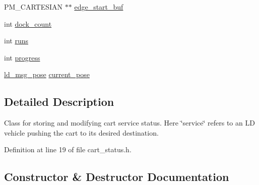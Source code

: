 \begin{DoxyCompactItemize}
\item 
P\+M\+\_\+\+C\+A\+R\+T\+E\+S\+I\+AN $\ast$$\ast$ \mbox{\hyperlink{classcart__status_ab0947b06cd41da791e41a480c42f795e}{edge\+\_\+start\+\_\+buf}}
\item 
int \mbox{\hyperlink{classcart__status_a37e9ce8c21a0d76250866a6fd7550024}{dock\+\_\+count}}
\item 
int \mbox{\hyperlink{classcart__status_a0bec0d5ce6fd94ac91633b6594b62f77}{runs}}
\item 
int \mbox{\hyperlink{classcart__status_a3d78cb0d051875d6e139d93cf2eb48f6}{progress}}
\item 
\mbox{\hyperlink{structld__msg__pose}{ld\+\_\+msg\+\_\+pose}} \mbox{\hyperlink{classcart__status_a5fe1250a34605ce2bea020047eb71223}{current\+\_\+pose}}
\end{DoxyCompactItemize}


\subsection{Detailed Description}
Class for storing and modifying cart service status. Here \char`\"{}service\char`\"{} refers to an LD vehicle pushing the cart to its desired destination. 

Definition at line 19 of file cart\+\_\+status.\+h.



\subsection{Constructor \& Destructor Documentation}
\mbox{\label{classcart__status_ac9302583f7f24fbc6c205a81416ff397}} 
